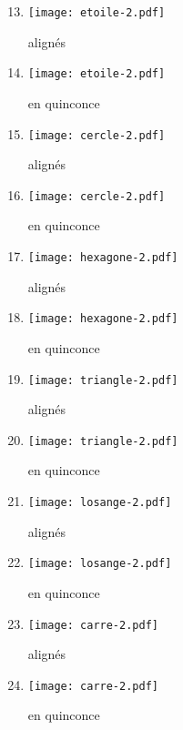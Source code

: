 \hfill
\begin{minipage}[t]{7cm}
\begin{enumerate}\setcounter{enumi}{12}
\item \begin{minipage}{1.75cm}\texttt{[image: etoile-2.pdf]}\end{minipage} alignés
\item \begin{minipage}{1.75cm}\texttt{[image: etoile-2.pdf]}\end{minipage} en quinconce
\item \begin{minipage}{1.75cm}\texttt{[image: cercle-2.pdf]}\end{minipage} alignés
\item \begin{minipage}{1.75cm}\texttt{[image: cercle-2.pdf]}\end{minipage} en quinconce
\item \begin{minipage}{1.75cm}\texttt{[image: hexagone-2.pdf]}\end{minipage} alignés
\item \begin{minipage}{1.75cm}\texttt{[image: hexagone-2.pdf]}\end{minipage} en quinconce
\item \begin{minipage}{1.75cm}\texttt{[image: triangle-2.pdf]}\end{minipage} alignés
\item \begin{minipage}{1.75cm}\texttt{[image: triangle-2.pdf]}\end{minipage} en quinconce
\item \begin{minipage}{1.75cm}\texttt{[image: losange-2.pdf]}\end{minipage} alignés
\item \begin{minipage}{1.75cm}\texttt{[image: losange-2.pdf]}\end{minipage} en quinconce
\item \begin{minipage}{1.75cm}\texttt{[image: carre-2.pdf]}\end{minipage} alignés
\item \begin{minipage}{1.75cm}\texttt{[image: carre-2.pdf]}\end{minipage} en quinconce
\end{enumerate}
\end{minipage}

